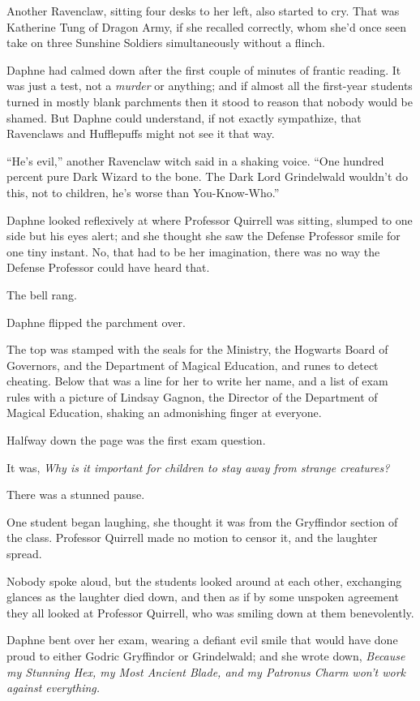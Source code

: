 Another Ravenclaw, sitting four desks to her left, also started to cry. That was Katherine Tung of Dragon Army, if she recalled correctly, whom she'd once seen take on three Sunshine Soldiers simultaneously without a flinch.

Daphne had calmed down after the first couple of minutes of frantic reading. It was just a test, not a \emph{murder} or anything; and if almost all the first-year students turned in mostly blank parchments then it stood to reason that nobody would be shamed. But Daphne could understand, if not exactly sympathize, that Ravenclaws and Hufflepuffs might not see it that way.

``He's evil,'' another Ravenclaw witch said in a shaking voice. ``One hundred percent pure Dark Wizard to the bone. The Dark Lord Grindelwald wouldn't do this, not to children, he's worse than You-Know-Who.''

Daphne looked reflexively at where Professor Quirrell was sitting, slumped to one side but his eyes alert; and she thought she saw the Defense Professor smile for one tiny instant. No, that had to be her imagination, there was no way the Defense Professor could have heard that.

The bell rang.

Daphne flipped the parchment over.

The top was stamped with the seals for the Ministry, the Hogwarts Board of Governors, and the Department of Magical Education, and runes to detect cheating. Below that was a line for her to write her name, and a list of exam rules with a picture of Lindsay Gagnon, the Director of the Department of Magical Education, shaking an admonishing finger at everyone.

Halfway down the page was the first exam question.

It was, \emph{Why is it important for children to stay away from strange creatures?}

There was a stunned pause.

One student began laughing, she thought it was from the Gryffindor section of the class. Professor Quirrell made no motion to censor it, and the laughter spread.

Nobody spoke aloud, but the students looked around at each other, exchanging glances as the laughter died down, and then as if by some unspoken agreement they all looked at Professor Quirrell, who was smiling down at them benevolently.

Daphne bent over her exam, wearing a defiant evil smile that would have done proud to either Godric Gryffindor or Grindelwald; and she wrote down, \emph{Because my Stunning Hex, my Most Ancient Blade, and my Patronus Charm won't work against everything.}

